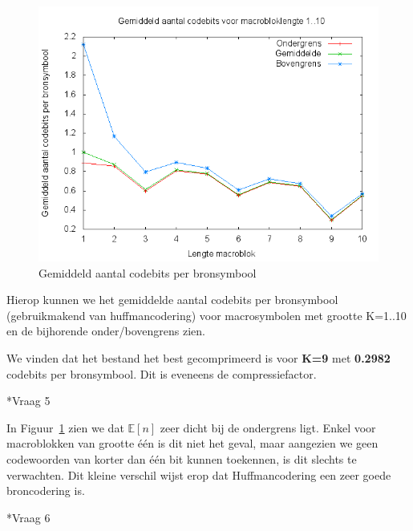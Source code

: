 \documentclass[]{article}
\begin{document}
\begin{section}
\begin{subsection}
        \begin{figure}[h]
            \centering
            \includegraphics[width=\textwidth]{vraag1_4.png}
            \caption{Gemiddeld aantal codebits per bronsymbool}
            \label{fig:codebits}
        \end{figure}

        Hierop kunnen we het gemiddelde aantal codebits per bronsymbool
        (gebruikmakend van huffmancodering) voor macrosymbolen met
        grootte K=1..10 en de bijhorende onder/bovengrens zien.

        We vinden dat het bestand het best gecomprimeerd is voor
        \textbf{K=9} met \textbf{0.2982} codebits per bronsymbool. Dit
        is eveneens de compressiefactor.

    \end{subsection}

    \begin{subsection}*{Vraag 5}

        In Figuur~\ref{fig:codebits} zien we dat $\mathbb{E}[n]$ zeer
        dicht bij de ondergrens ligt. Enkel voor macroblokken van
        grootte \'e\'en is dit niet het geval, maar aangezien we geen
        codewoorden van korter dan \'e\'en bit kunnen toekennen, is dit
        slechts te verwachten. Dit kleine verschil wijst erop dat
        Huffmancodering een zeer goede broncodering is.


    \end{subsection}

    \begin{subsection}*{Vraag 6}


\end{subsection}
\end{section}
\end{document}
